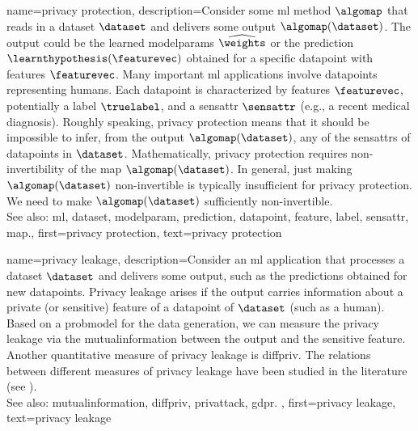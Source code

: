 {name={privacy protection},
     description={Consider some \gls{ml} method $\algomap$ that reads 
	 	in a \gls{dataset} $\dataset$ and delivers some \gls{output} $\algomap(\dataset)$. The \gls{output} 
	 	could be the learned \glspl{modelparam} $\widehat{\weights}$ or the \gls{prediction} 
	 	$\learnthypothesis(\featurevec)$ obtained for a specific \gls{datapoint} with \glspl{feature} 
	 	$\featurevec$. Many important \gls{ml} applications involve \glspl{datapoint} 
		representing humans. Each \gls{datapoint} is characterized by \glspl{feature} $\featurevec$, 
		potentially a \gls{label} $\truelabel$, and a \gls{sensattr} $\sensattr$ (e.g., a recent medical diagnosis). 
		Roughly speaking, privacy protection means that it should be impossible to infer, from the \gls{output} $\algomap(\dataset)$, 
		any of the \glspl{sensattr} of \glspl{datapoint} in $\dataset$. Mathematically, privacy protection requires non-invertibility 
		of the \gls{map} $\algomap(\dataset)$. In general, just making $\algomap(\dataset)$ non-invertible 
		is typically insufficient for privacy protection. We need to make $\algomap(\dataset)$ sufficiently non-invertible. 
					\\ 
		See also: \gls{ml}, \gls{dataset}, \gls{modelparam}, \gls{prediction}, \gls{datapoint}, \gls{feature}, \gls{label}, \gls{sensattr}, \gls{map}.}, 
	first={privacy protection}, 
	text={privacy protection} 
}

{name={privacy leakage},
	description={Consider an \gls{ml} application that processes a 
		\gls{dataset} $\dataset$ and delivers some \gls{output}, such as the \glspl{prediction} 
		obtained for new \glspl{datapoint}. Privacy leakage arises 
		if the \gls{output} carries information about a private (or sensitive) \gls{feature} of 
		a \gls{datapoint} of $\dataset$ (such as a human). Based on a \gls{probmodel} 
		for the \gls{data} generation, we can measure the privacy leakage via the \gls{mutualinformation} 
		between the \gls{output} and the sensitive \gls{feature}. Another quantitative \gls{measure} of privacy leakage 
		is \gls{diffpriv}. The relations between different \glspl{measure} of privacy leakage have been 
		studied in the literature (see \cite{InfThDiffPriv}). 
				\\ 
		See also: \gls{mutualinformation}, \gls{diffpriv}, \gls{privattack}, \gls{gdpr}. }, 
	first={privacy leakage}, 
	text={privacy leakage} 
}

